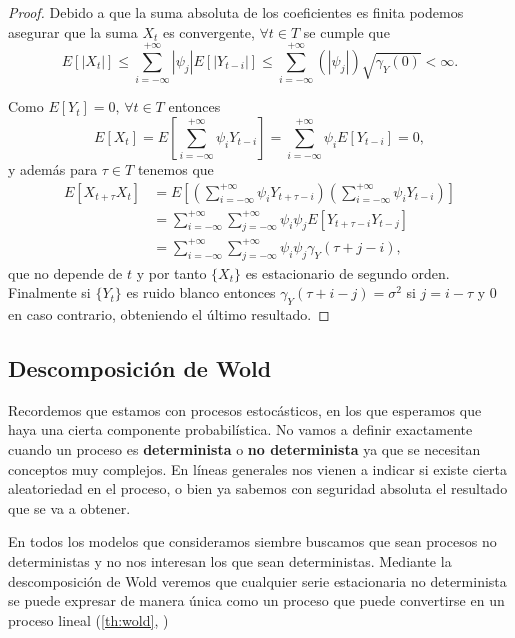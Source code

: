 \begin{proof}
  Debido a que la suma absoluta de los coeficientes es finita podemos asegurar que la suma $X_t$ es convergente, $\forall t \in T$ se cumple que
  $$E[|X_t|] \leq \sum \limits^{+\infty}_{i = -\infty} |\psi_j| E[|Y_{t-i}|] \leq \sum \limits^{+\infty}_{i = -\infty} \left(|\psi_j|\right) \sqrt{\gamma_Y(0)} < \infty.$$

  Como $E[Y_t] = 0, \, \forall t \in T$ entonces
  $$E[X_t] = E\left[\sum \limits^{+\infty}_{i = -\infty} \psi_i Y_{t - i}\right] = \sum \limits^{+\infty}_{i = -\infty} \psi_i E[Y_{t-i}] = 0,$$
  y además para $\tau \in T$ tenemos que
  $$\begin{aligned}
    E[X_{t+\tau}X_t] & = E\left[\left(\sum \limits^{+\infty}_{i = -\infty} \psi_i Y_{t + \tau - i}\right)\left(\sum \limits^{+\infty}_{i = -\infty} \psi_i Y_{t -i}\right)\right] \\
    & = \sum \limits^{+\infty}_{i = -\infty} \sum \limits^{+\infty}_{j = -\infty} \psi_i \psi_j E[Y_{t+\tau-i}Y_{t-j}] \\
    & = \sum \limits^{+\infty}_{i = -\infty}  \sum \limits^{+\infty}_{j = -\infty} \psi_i \psi_j \gamma_Y(\tau + j - i),
  \end{aligned}$$
  que no depende de $t$ y por tanto $\{X_t\}$ es estacionario de segundo orden. Finalmente si $\{Y_t\}$ es ruido blanco entonces $\gamma_Y(\tau + i - j) = \sigma^2$ si $j = i - \tau$ y 0 en caso contrario, obteniendo el último resultado.
\end{proof}

\subsection{Descomposición de Wold}

Recordemos que estamos con procesos estocásticos, en los que esperamos que haya una cierta componente probabilística. No vamos a definir exactamente cuando un proceso es \textbf{determinista} o \textbf{no determinista} ya que se necesitan conceptos muy complejos. En líneas generales nos vienen a indicar si existe cierta aleatoriedad en el proceso, o bien ya sabemos con seguridad absoluta el resultado que se va a obtener.

En todos los modelos que consideramos siembre buscamos que sean procesos no deterministas y no nos interesan los que sean deterministas. Mediante la descomposición de Wold veremos que cualquier serie estacionaria no determinista se puede expresar de manera única como un proceso que puede convertirse en un proceso lineal (\autoref{th:wold}, \cite{wold1938decomposition})

